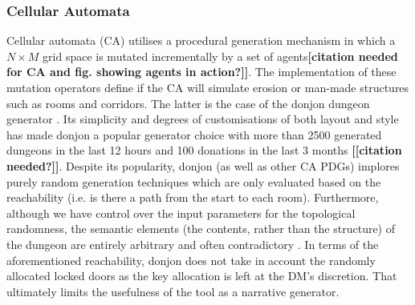 \documentclass{UoYCSproject}
\begin{document}
\subsubsection{Cellular Automata}
Cellular automata (CA) utilises a procedural generation mechanism in which a $N \times M$ grid space is mutated incrementally by a set of agents\textbf{[citation needed for CA and fig. showing agents in action?]]}. The implementation of these mutation operators define if the CA will simulate erosion \parencite{donjonCA} or man-made structures such as rooms and corridors. The latter is the case of the donjon dungeon generator \parencite{donjonPDG}. Its simplicity and degrees of customisations of both layout and style has made donjon a popular generator choice with more than 2500 generated dungeons in the last 12 hours and 100 donations in the last 3 months \textbf{[[citation needed?]]}. Despite its popularity, donjon (as well as other CA PDGs) implores purely random generation techniques which are only evaluated based on the reachability (i.e. is there a path from the start to each room). Furthermore, although we have control over the input parameters for the topological randomness, the semantic elements (the contents, rather than the structure) of the dungeon are entirely arbitrary and often contradictory \parencite{Thrall,Brown}. In terms of the aforementioned reachability, donjon does not take in account the randomly allocated locked doors as the key allocation is left at the DM's discretion. That ultimately limits the usefulness of the tool as a narrative generator. %
\end{document}

